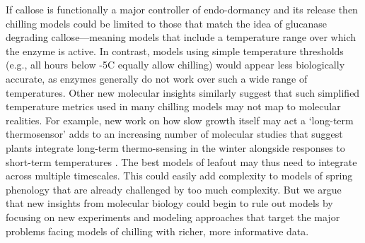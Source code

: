 \documentclass[11pt]{article}
\begin{document}
If callose is functionally a major controller of endo-dormancy and its release then chilling models could be limited to those that match the idea of glucanase degrading callose---meaning models that include a temperature range over which the enzyme is active. In contrast, models using simple temperature thresholds (e.g., all hours below -5\degree C equally allow chilling) would appear less biologically accurate, as enzymes generally do not work over such a wide range of temperatures. Other new molecular insights similarly suggest that such simplified temperature metrics used in many chilling models may not map to molecular realities. For example, new work on how slow growth itself may act  a `long-term thermosensor' \citep{zhao2020temperature} 
adds to an increasing number of molecular studies that suggest plants integrate long-term thermo-sensing in the winter alongside responses to short-term temperatures \citep{antoniou2021feeling,Satake2022}. The best models of leafout may thus need to integrate across multiple timescales. This could easily add complexity to models of spring phenology that are already challenged by too much complexity. But we argue that new insights from molecular biology could begin to rule out models by focusing on new experiments and modeling approaches that target the major problems facing models of chilling with richer, more informative data. 


\end{document}
